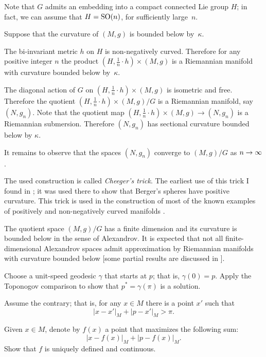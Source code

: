 \medskip

Note that $G$ admits an embedding into a compact connected Lie group $H$;
in fact, we can assume that $H=\mathrm{SO}(n)$, for sufficiently large~$n$.

Suppose that the curvature of $(M,g)$ is bounded below by~$\kappa$.

The bi-invariant metric $h$ on $H$ is non-negatively curved.
Therefore for any positive integer $n$ the product $(H,\tfrac1n\cdot h)\times (M,g)$ is a Riemannian manifold with  curvature bounded below by~$\kappa$.

The diagonal action of $G$ on $(H,\tfrac1n\cdot h)\times (M,g)$ is isometric and free. 
Therefore 
the quotient $(H,\tfrac1n\cdot h)\times (M,g)/G$
is a Riemannian manifold, say $(N,g_n)$.
Note that the quotient map $(H,\tfrac1n\cdot h)\times (M,g)\to (N,g_n)$ is a Riemannian submersion.
Therefore $(N,g_n)$ has sectional curvature bounded below by $\kappa$.

It remains to observe that the spaces $(N,g_n)$ converge to $(M,g)/G$ as $n\z\to \infty$.\qeds

The used construction is called \emph{Cheeger's trick}.
The earliest use of this trick I found in \cite{GKM}; 
it was used there to show that Berger's spheres have positive curvature.
This trick is used in the construction of most of the known examples of positively and non-negatively curved manifolds
 \cite{cheeger,aloff-wallach,gromoll-meyer,eschenburg-spaces,bazajkin}.
 
The quotient space $(M,g)/G$ has a finite dimension and its curvature is bounded below in the sense of Alexandrov. 
It is expected that not all finite-dimensional Alexandrov spaces admit approximation by Riemannian manifolds with curvature bounded below
[some partial results are discussed in ].








Choose a unit-speed geodesic $\gamma$ that starts at $p$;
that is, $\gamma(0)=p$.
Apply the Toponogov comparison to show that $p^*=\gamma(\pi)$ is a solution. 
\qeds

Assume the contrary;
that is, for any $x\in M$ there is a point $x'$ such that 
\[|x-x'|_M+|p-x'|_M>\pi.\]

Given $x\in M$, denote by $f(x)$ a point that maximizes the following sum:
\[|x-f(x)|_M+|p-f(x)|_M.\]
Show that $f$ is uniquely defined and continuous.

